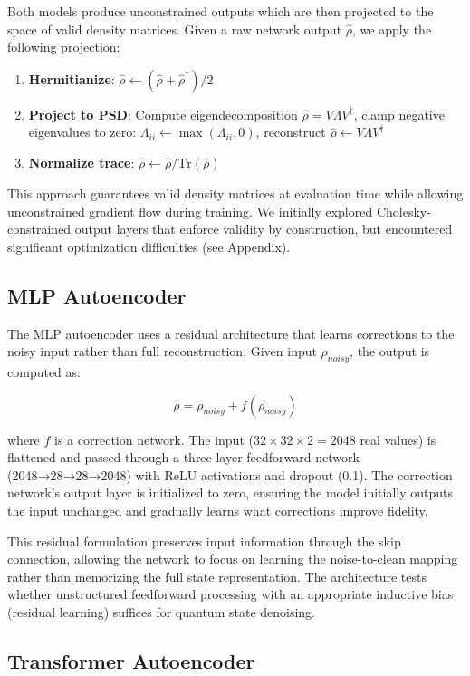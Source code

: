 \documentclass[11pt]{article}
\begin{document}
Both models produce unconstrained outputs which are then projected to the space of valid density matrices. Given a raw network output \(\hat{\rho}\), we apply the following projection:

\begin{enumerate}
\item \textbf{Hermitianize}: \(\hat{\rho} \leftarrow (\hat{\rho} + \hat{\rho}^\dagger)/2\)
\item \textbf{Project to PSD}: Compute eigendecomposition \(\hat{\rho} = V \Lambda V^\dagger\), clamp negative eigenvalues to zero: \(\Lambda_{ii} \leftarrow \max(\Lambda_{ii}, 0)\), reconstruct \(\hat{\rho} \leftarrow V \Lambda V^\dagger\)
\item \textbf{Normalize trace}: \(\hat{\rho} \leftarrow \hat{\rho} / \mathrm{Tr}(\hat{\rho})\)
\end{enumerate}

This approach guarantees valid density matrices at evaluation time while allowing unconstrained gradient flow during training. We initially explored Cholesky-constrained output layers that enforce validity by construction, but encountered significant optimization difficulties (see Appendix).
\subsection{MLP Autoencoder}
\label{sec:orgaa865d6}

The MLP autoencoder uses a residual architecture that learns corrections to the noisy input rather than full reconstruction. Given input \(\rho_{noisy}\), the output is computed as:

$$\hat{\rho} = \rho_{noisy} + f(\rho_{noisy})$$

where \(f\) is a correction network. The input (\(32 \times 32 \times 2 = 2048\) real values) is flattened and passed through a three-layer feedforward network (2048→28→28→2048) with ReLU activations and dropout (0.1). The correction network's output layer is initialized to zero, ensuring the model initially outputs the input unchanged and gradually learns what corrections improve fidelity.

This residual formulation preserves input information through the skip connection, allowing the network to focus on learning the noise-to-clean mapping rather than memorizing the full state representation. The architecture tests whether unstructured feedforward processing with an appropriate inductive bias (residual learning) suffices for quantum state denoising.
\subsection{Transformer Autoencoder}
\label{sec:orgf684e2d}
\end{document}
